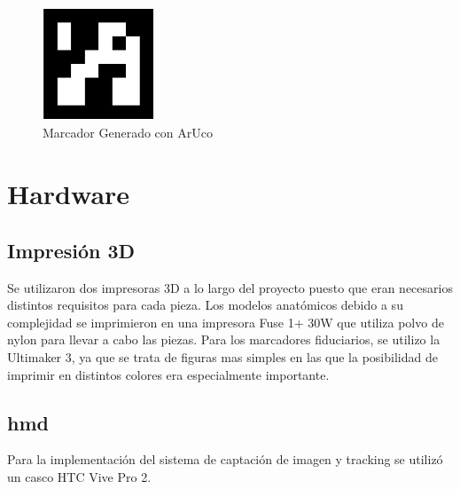 \begin{figure}[hp!]
  \centering
  \includegraphics[width=0.3\textwidth]{imaxes/qr.png}
  \caption{Marcador Generado con ArUco}
  \label{fig:qr}
\end{figure}


\section{Hardware}
\subsection{Impresión 3D}
Se utilizaron dos impresoras 3D a lo largo del proyecto puesto que eran necesarios distintos requisitos para cada pieza.
Los modelos anatómicos debido a su complejidad se imprimieron en una impresora Fuse 1+ 30W que utiliza polvo de nylon para llevar a cabo las piezas.
Para los marcadores fiduciarios, se utilizo la Ultimaker 3, ya que se trata de figuras mas simples en las que la posibilidad de imprimir en distintos colores era especialmente importante.
\subsection{\acrfull{hmd}}
Para la implementación del sistema de captación de imagen y tracking se utilizó un casco HTC Vive Pro 2.

